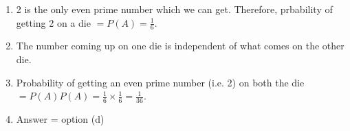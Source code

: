 \renewcommand{\theequation}{\theenumi}
\begin{enumerate}[label=\thesection.\arabic*.,ref=\thesection.\theenumi]
\item 2 is the only even prime number which we can get. Therefore, prbability of getting 2 on a die $= P(A) = \frac{1}{6}$.
\item The number coming up on one die is independent of what comes on the other die.
\item Probability of getting an even prime number (i.e. 2) on both the die $= P(A)P(A) = \frac{1}{6}\times\frac{1}{6} = \frac{1}{36}$.
\item Answer = option (d)

\end{enumerate}
